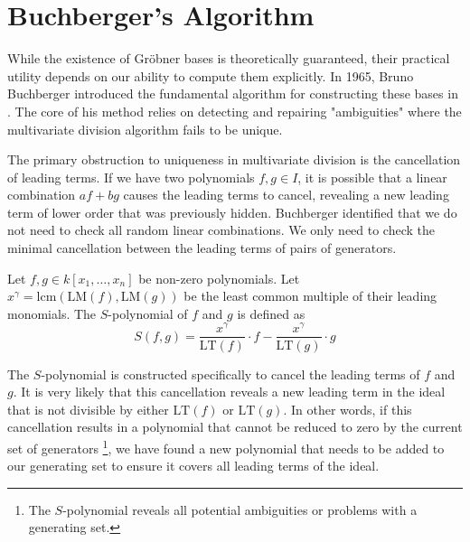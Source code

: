 \section{Buchberger's Algorithm}

While the existence of Gröbner bases is theoretically guaranteed, their practical utility depends on our ability to compute them explicitly. In 1965, Bruno Buchberger introduced the fundamental algorithm for constructing these bases in \cite{Buchberger1965_algorithmGerman,Buchberger1965_algorithmEnglish}. The core of his method relies on detecting and repairing "ambiguities" where the multivariate division algorithm fails to be unique.

The primary obstruction to uniqueness in multivariate division is the cancellation of leading terms. If we have two polynomials $f, g \in I$, it is possible that a linear combination $af + bg$ causes the leading terms to cancel, revealing a new leading term of lower order that was previously hidden. Buchberger identified that we do not need to check all random linear combinations. We only need to check the minimal cancellation between the leading terms of pairs of generators.

\begin{definition}[$S$-polynomial]
\label{def:s_polynomial}
Let $f, g \in k[x_1, \dots, x_n]$ be non-zero polynomials. Let $x^\gamma = \text{lcm}(\text{LM}(f), \text{LM}(g))$ be the least common multiple of their leading monomials. The $S$-polynomial of $f$ and $g$ is defined as
$$
S(f, g) = \frac{x^\gamma}{\text{LT}(f)} \cdot f - \frac{x^\gamma}{\text{LT}(g)} \cdot g
$$
\end{definition}

The $S$-polynomial is constructed specifically to cancel the leading terms of $f$ and $g$. It is very likely that this cancellation reveals a new leading term in the ideal that is not divisible by either $\text{LT}(f)$ or $\text{LT}(g)$. In other words, if this cancellation results in a polynomial that cannot be reduced to zero by the current set of generators \footnote{The $S$-polynomial reveals all potential ambiguities or problems with a generating set.}, we have found a new polynomial that needs to be added to our generating set to ensure it covers all leading terms of the ideal.

